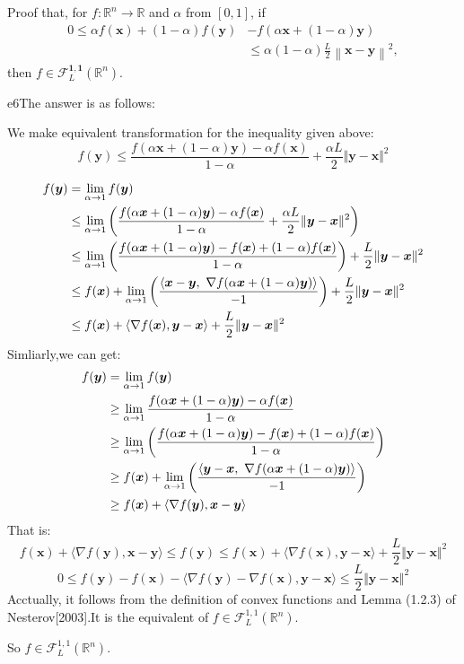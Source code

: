 \documentclass{article}
\newcommand{\xB}{\bm{x}}
\newcommand{\yB}{\bm{y}}
\newcommand{\RBB}{\mathbb{R}}
\newcommand{\FM}{\mathcal{F}}
\newcommand{\functiontype}[3]{\FM_{#1}^{#2,#3}(\RBB^n)}
\newcommand{\normgen}[1]{\left\| #1 \right\|}
\begin{document}
\begin{excercise}\label{e6}
	Proof that, for $f: \RBB^n \rightarrow \RBB$ and $\alpha$ from $[0,1]$,  if
\begin{align*} 
	0  \leq  \alpha f(\xB) + (1-\alpha) f(\yB)  &-  f( \alpha \xB + (1-\alpha) \yB) \nonumber \\
	&\leq \alpha (1-\alpha) \frac{L}{2} \normgen{\xB - \yB}^2,
\end{align*}
	then $f \in \functiontype{L}{\bm{1}}{\bm{1}}$.
\end{excercise}
\begin{PROOF}{e6}The answer is as follows:

	We make equivalent transformation for the inequality given above:
	\begin{equation}
		f(\yB)\le \frac{f(\alpha \xB+(1-\alpha)\yB)-\alpha f(\xB)}{1-\alpha}+\frac{\alpha L}{2}\Vert \yB-\xB\Vert ^2
	\end{equation}

	\begin{align}
		f(\yB) &= \lim_{\alpha \rightarrow 1}f(\yB)\\
		&\le \lim_{\alpha \rightarrow 1} \left(\frac{f(\alpha \xB + (1-\alpha) \yB)-\alpha f(\xB)}{1-\alpha}+\frac{\alpha L}{2}\Vert \yB-\xB\Vert ^2\right)\\
		&\le \lim_{\alpha \rightarrow 1} \left(\frac{f(\alpha \xB + (1-\alpha) \yB)-f(\xB)+(1-\alpha)f(\xB)}{1-\alpha}\right)+\frac{L}{2}\Vert \yB-\xB\Vert ^2\\
		&\le f(\xB)+\lim_{\alpha \rightarrow 1} \left(\frac{\innerproduct{\xB-\yB}{\nabla f(\alpha \xB + (1-\alpha) \yB)}}{-1}\right)+\frac{L}{2}\Vert \yB-\xB\Vert ^2\\
		&\le f(\xB)+\langle\nabla f(\xB),\yB-\xB\rangle+\frac{L}{2}\Vert \yB-\xB\Vert ^2
	\end{align}
	Simliarly,we can get:
	\begin{align}
		f(\yB) &= \lim_{\alpha \rightarrow 1}f(\yB)\\
		&\ge \lim_{\alpha \rightarrow 1} \frac{f(\alpha \xB + (1-\alpha) \yB)-\alpha f(\xB)}{1-\alpha}\\
		&\ge \lim_{\alpha \rightarrow 1} \left(\frac{f(\alpha \xB + (1-\alpha) \yB)-f(\xB)+(1-\alpha)f(\xB)}{1-\alpha}\right)\\
		&\ge f(\xB)+\lim_{\alpha \rightarrow 1} \left(\frac{\innerproduct{\yB-\xB}{\nabla f(\alpha \xB + (1-\alpha) \yB)}}{-1}\right)\\
		&\ge f(\xB)+\langle\nabla f(\yB),\xB-\yB\rangle
	\end{align}
	That is:
	\begin{equation}
		f(\xB)+\langle\nabla f(\yB),\xB-\yB\rangle \le f(\yB)\le f(\xB)+\langle\nabla f(\xB),\yB-\xB\rangle+\frac{L}{2}\Vert \yB-\xB\Vert ^2
	\end{equation}
	\begin{equation}
		0 \le f(\yB) - f(\xB) - \langle\nabla f(\yB)-\nabla f(\xB),\yB-\xB\rangle \le \frac{L}{2}\Vert \yB-\xB\Vert ^2
	\end{equation}
	Acctually, it follows from the definition of convex functions and Lemma (1.2.3) of Nesterov[2003].It is the equivalent of $f\in \mathcal{F}_L^{1,1}(\mathbb{R}^n)$. 
	
	So $f\in \mathcal{F}_L^{1,1}(\mathbb{R}^n)$.

\end{PROOF}
\end{document}
